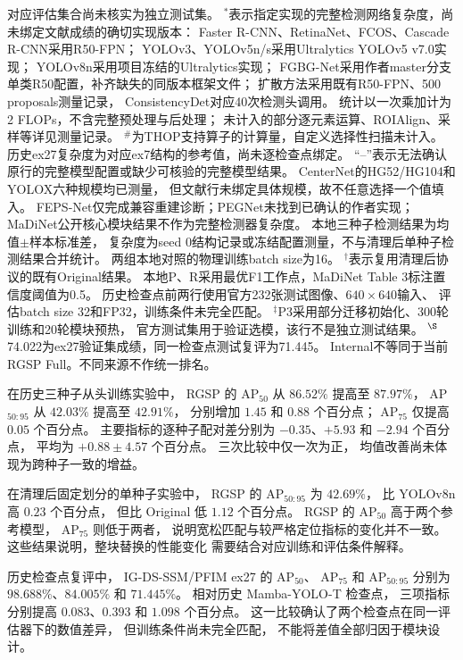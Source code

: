 \documentclass[journal]{IEEEtran}
\begin{document}
\begin{table}[!t]
\begin{minipage}{\linewidth}
对应评估集合尚未核实为独立测试集。
$^{*}$表示指定实现的完整检测网络复杂度，尚未绑定文献成绩的确切实现版本：
Faster R-CNN、RetinaNet、FCOS、Cascade R-CNN采用R50-FPN；
YOLOv3、YOLOv5n/s采用Ultralytics YOLOv5 v7.0实现；
YOLOv8n采用项目冻结的Ultralytics实现；
FGBG-Net采用作者master分支单类R50配置，补齐缺失的同版本框架文件；
扩散方法采用既有R50-FPN、500 proposals测量记录，
ConsistencyDet对应40次检测头调用。
统计以一次乘加计为2 FLOPs，不含完整预处理与后处理；
未计入的部分逐元素运算、ROIAlign、采样等详见测量记录。
$^{\#}$为THOP支持算子的计算量，自定义选择性扫描未计入。
历史ex27复杂度为对应ex7结构的参考值，尚未逐检查点绑定。
“--”表示无法确认原行的完整模型配置或缺少可核验的完整模型结果。
CenterNet的HG52/HG104和YOLOX六种规模均已测量，
但文献行未绑定具体规模，故不任意选择一个值填入。
FEPS-Net仅完成兼容重建诊断；PEGNet未找到已确认的作者实现；
MaDiNet公开核心模块结果不作为完整检测器复杂度。
本地三种子检测结果为均值$\pm$样本标准差，
复杂度为seed 0结构记录或冻结配置测量，不与清理后单种子检测结果合并统计。
两组本地对照的物理训练batch size为16。
$^{\dagger}$表示复用清理后协议的既有Original结果。
本地P、R采用最优F1工作点，MaDiNet Table 3标注置信度阈值为0.5。
历史检查点前两行使用官方232张测试图像、$640\times640$输入、
评估batch size 32和FP32，训练条件未完全匹配。
$^{\ddagger}$P3采用部分迁移初始化、300轮训练和20轮模块预热，
官方测试集用于验证选模，该行不是独立测试结果。
$^{\S}$74.022为ex27验证集成绩，同一检查点测试复评为71.445。
Internal不等同于当前RGSP Full。不同来源不作统一排名。
\end{minipage}
\end{table}

在历史三种子从头训练实验中，
RGSP 的 AP$_{50}$ 从 $86.52\%$ 提高至 $87.97\%$，
AP$_{50:95}$ 从 $42.03\%$ 提高至 $42.91\%$，
分别增加 $1.45$ 和 $0.88$ 个百分点；
AP$_{75}$ 仅提高 $0.05$ 个百分点。
主要指标的逐种子配对差分别为
$-0.35$、$+5.93$ 和 $-2.94$ 个百分点，
平均为 $+0.88\pm4.57$ 个百分点。
三次比较中仅一次为正，
均值改善尚未体现为跨种子一致的增益。

在清理后固定划分的单种子实验中，
RGSP 的 AP$_{50:95}$ 为 $42.69\%$，
比 YOLOv8n 高 $0.23$ 个百分点，
但比 Original 低 $1.12$ 个百分点。
RGSP 的 AP$_{50}$ 高于两个参考模型，
AP$_{75}$ 则低于两者，
说明宽松匹配与较严格定位指标的变化并不一致。
这些结果说明，整块替换的性能变化
需要结合对应训练和评估条件解释。

历史检查点复评中，
IG-DS-SSM/PFIM ex27 的 AP$_{50}$、
AP$_{75}$ 和 AP$_{50:95}$
分别为 $98.688\%$、$84.005\%$ 和 $71.445\%$。
相对历史 Mamba-YOLO-T 检查点，
三项指标分别提高 $0.083$、$0.393$
和 $1.098$ 个百分点。
这一比较确认了两个检查点在同一评估器下的数值差异，
但训练条件尚未完全匹配，
不能将差值全部归因于模块设计。
\end{document}
